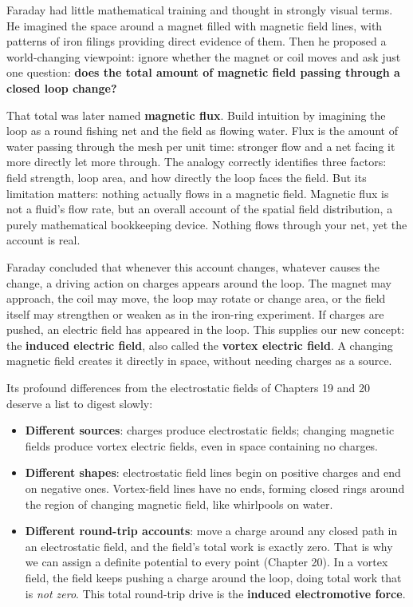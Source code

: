 
Faraday had little mathematical training and thought in strongly visual terms. He imagined the space around a magnet filled with magnetic field lines, with patterns of iron filings providing direct evidence of them. Then he proposed a world-changing viewpoint: ignore whether the magnet or coil moves and ask just one question: \textbf{does the total amount of magnetic field passing through a closed loop change?}

That total was later named \textbf{magnetic flux}. Build intuition by imagining the loop as a round fishing net and the field as flowing water. Flux is the amount of water passing through the mesh per unit time: stronger flow and a net facing it more directly let more through. The analogy correctly identifies three factors: field strength, loop area, and how directly the loop faces the field. But its limitation matters: nothing actually flows in a magnetic field. Magnetic flux is not a fluid's flow rate, but an overall account of the spatial field distribution, a purely mathematical bookkeeping device. Nothing flows through your net, yet the account is real.

Faraday concluded that whenever this account changes, whatever causes the change, a driving action on charges appears around the loop. The magnet may approach, the coil may move, the loop may rotate or change area, or the field itself may strengthen or weaken as in the iron-ring experiment. If charges are pushed, an electric field has appeared in the loop. This supplies our new concept: the \textbf{induced electric field}, also called the \textbf{vortex electric field}. A changing magnetic field creates it directly in space, without needing charges as a source.

Its profound differences from the electrostatic fields of Chapters 19 and 20 deserve a list to digest slowly:

\begin{itemize}
\item \textbf{Different sources}: charges produce electrostatic fields; changing magnetic fields produce vortex electric fields, even in space containing no charges.
\item \textbf{Different shapes}: electrostatic field lines begin on positive charges and end on negative ones. Vortex-field lines have no ends, forming closed rings around the region of changing magnetic field, like whirlpools on water.
\item \textbf{Different round-trip accounts}: move a charge around any closed path in an electrostatic field, and the field's total work is exactly zero. That is why we can assign a definite potential to every point (Chapter 20). In a vortex field, the field keeps pushing a charge around the loop, doing total work that is \emph{not zero}. This total round-trip drive is the \textbf{induced electromotive force}.
\end{itemize}

